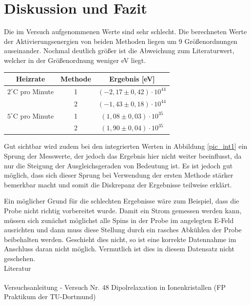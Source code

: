 \section{Diskussion und Fazit}
Die im Versuch aufgenommenen Werte sind sehr schlecht.
Die berechneten Werte der Aktivierungsenergien von beiden Methoden liegen um 9 Größenordnungen auseinander.  Nochmal deutlich größer ist die Abweichung zum Literaturwert, welcher in der Größenordnung weniger eV liegt.
\begin{table}[H]
\begin{tabular}{c|c|c}
Heizrate & Methode & Ergebnis [eV]\\\hline
$2^\circ$C pro Minute & 1 &	$(-2,17\pm 0,42)\cdot10^{44}$	\\
 & 2 &		$(-1,43 \pm 0,18)\cdot10^{44}$\\\hline
 $5^\circ$C pro Minute & 1 &	$(1,08    \pm 0,03)\cdot 10^{35}$	\\
 & 2 &	$(1,90	\pm 0,04)\cdot 10^{35}$	\\
\end{tabular}
\end{table}

Gut sichtbar wird zudem bei den integrierten Werten in Abbildung \ref{pic_int1} ein Sprung der Messwerte, der jedoch das Ergebnis hier nicht weiter beeinflusst, da nur die Steigung der Ausgleichsgeraden von Bedeutung ist. Es ist jedoch gut möglich, dass sich dieser Sprung bei Verwendung der ersten Methode stärker bemerkbar macht und somit die Diskrepanz der Ergebnisse teilweise erklärt. 

Ein möglicher Grund für die schlechten Ergebnisse wäre zum Beispiel, dass die Probe nicht richtig vorbereitet wurde. Damit ein Strom gemessen werden kann, müssen sich zunächst möglichst alle Spins in der Probe im angelegten E-Feld ausrichten und dann muss diese Stellung durch ein rasches Abkühlen der Probe beibehalten werden. Geschieht dies nicht, so ist eine korrekte Datennahme im Anschluss daran nicht möglich. Vermutlich ist dies in diesem Datensatz nicht geschehen.\\


\parskip 340pt
\Large{Literatur}\\\\
Versuchsanleitung - Versuch Nr. 48 Dipolrelaxation in Ionenkristallen (FP Praktikum der TU-Dortmund)





